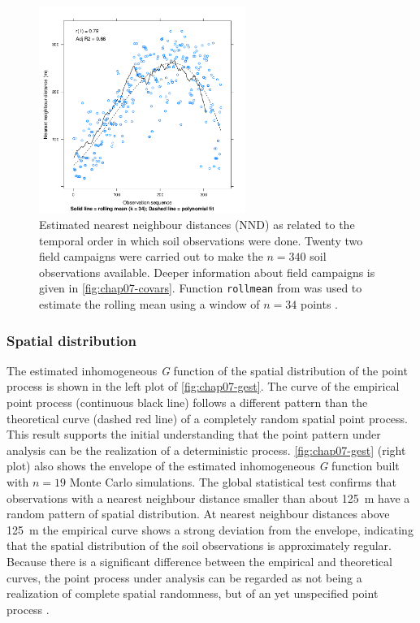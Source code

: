 \begin{figure}[!ht]
\centering
\includegraphics[trim=0mm 0mm 0mm 12mm, clip=true, width = 0.6\textwidth]{fig/chap07-nndistG}
\caption[Nearest neighbour distances and the order of soil observation.]{Estimated nearest neighbour distances 
(NND) as related to the temporal order in which soil observations were done. Twenty two field campaigns were 
carried out to make the $n = 340$ soil observations available. Deeper information about field campaigns is 
given in \autoref{fig:chap07-covars}. Function \texttt{rollmean} from  was used to estimate the 
rolling mean using a window of $n = 34$ points \cite{ZeileisEtAl2005}.}
\label{fig:chap07-nndistG}
\end{figure}

\subsubsection{Spatial distribution}

The estimated inhomogeneous \emph{G} function of the spatial distribution of the point process is shown in the 
left plot of \autoref{fig:chap07-gest}. The curve of the empirical point process (continuous black line) 
follows a different pattern than the theoretical curve (dashed red line) of a completely random spatial point 
process. This result supports the initial understanding that the point pattern under analysis can be the 
realization of a deterministic process. \autoref{fig:chap07-gest} (right plot) also shows the envelope of the 
estimated inhomogeneous \emph{G} function built with $n = 19$ Monte Carlo simulations. The global statistical 
test confirms that observations with a nearest neighbour distance smaller than about \SI{125}{\m} have a 
random pattern of spatial distribution. At nearest neighbour distances above \SI{125}{\m} the empirical curve 
shows a strong deviation from the envelope, indicating that the spatial distribution of the soil observations 
is approximately regular. Because there is a significant difference between the empirical and theoretical 
curves, the point process under analysis can be regarded as not being a realization of complete spatial 
randomness, but of an yet unspecified point process \cite{Baddeley2010}.

